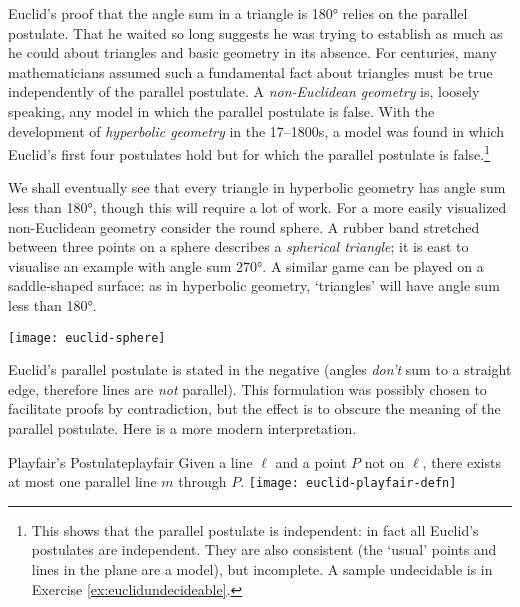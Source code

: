 Euclid's proof that the angle sum in a triangle is \ang{180} relies on the parallel postulate. That he waited so long suggests he was trying to establish as much as he could about triangles and basic geometry in its absence. For centuries, many mathematicians assumed such a fundamental fact about triangles must be true independently of the parallel postulate.\smallbreak
A \emph{non-Euclidean geometry} is, loosely speaking, any model in which the parallel postulate is false. With the development of \emph{hyperbolic geometry} in the 17--1800s, a model was found in which Euclid's first four postulates hold but for which the parallel postulate is false.\footnote{This shows that the parallel postulate is independent: in fact all Euclid's postulates are independent. They are also consistent (the `usual' points and lines in the plane are a model), but incomplete. A sample undecidable is in Exercise \ref{ex:euclidundecideable}.}\par
\begin{minipage}[t]{0.76\linewidth}\vspace{-5pt}
We shall eventually see that every triangle in hyperbolic geometry has angle sum less than \ang{180}, though this will require a lot of work. For a more easily visualized non-Euclidean geometry consider the round sphere. A rubber band stretched between three points on a sphere describes a \emph{spherical triangle}; it is east to visualise an example with angle sum \ang{270}. A similar game can be played on a saddle-shaped surface: as in hyperbolic geometry, `triangles' will have angle sum less than \ang{180}.
\end{minipage}\hfill\begin{minipage}[t]{0.23\linewidth}\vspace{-10pt}
\flushright\texttt{[image: euclid-sphere]}
\end{minipage}

\goodbreak




Euclid's parallel postulate is stated in the negative (angles \emph{don't} sum to a straight edge, therefore lines are \emph{not} parallel). This formulation was possibly chosen to facilitate proofs by contradiction, but the effect is to obscure the meaning of the parallel postulate. Here is a more modern interpretation.

\begin{axiom}[lower separated=false, sidebyside, sidebyside align=top seam, sidebyside gap=0pt, righthand width=0.37\linewidth]{Playfair's Postulate}{playfair}
Given a line $\ell$ and a point $P$ not on $\ell$, there exists at most one parallel line $m$ through $P$.
\tcblower
\flushright\texttt{[image: euclid-playfair-defn]}
\end{axiom}


